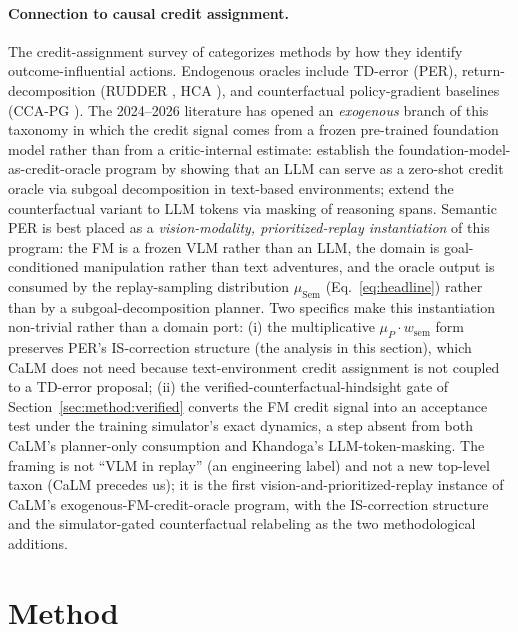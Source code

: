 \documentclass{article}
\begin{document}
\paragraph{Connection to causal credit assignment.}
The credit-assignment survey of \citet{pignatelli2023survey} categorizes methods
by how they identify outcome-influential actions. Endogenous oracles include
TD-error (PER), return-decomposition (RUDDER \citep{arjonamedina2019rudder},
HCA \citep{harutyunyan2019hca}), and counterfactual policy-gradient baselines
(CCA-PG \citep{mesnard2021cca}). The 2024--2026 literature has opened an
\emph{exogenous} branch of this taxonomy in which the credit signal comes
from a frozen pre-trained foundation model rather than from a critic-internal
estimate: \citet{pignatelli2024calm} establish the foundation-model-as-credit-oracle
program by showing that an LLM can serve as a zero-shot credit oracle via
subgoal decomposition in text-based environments; \citet{khandoga2026causalcredit}
extend the counterfactual variant to LLM tokens via masking of reasoning spans.
Semantic PER is best placed as a \emph{vision-modality, prioritized-replay
instantiation} of this program: the FM is a frozen VLM rather than an LLM, the
domain is goal-conditioned manipulation rather than text adventures, and the
oracle output is consumed by the replay-sampling distribution
$\mu_{\text{Sem}}$ (Eq.~\eqref{eq:headline}) rather than by a subgoal-decomposition
planner. Two specifics make this instantiation non-trivial rather than a
domain port: (i) the multiplicative $\mu_P\!\cdot\!w_{\text{sem}}$ form
preserves PER's IS-correction structure (the analysis in this section),
which CaLM does not need because text-environment credit assignment is not
coupled to a TD-error proposal; (ii) the verified-counterfactual-hindsight
gate of Section~\ref{sec:method:verified} converts the FM credit signal into
an acceptance test under the training simulator's exact dynamics, a step
absent from both CaLM's planner-only consumption and Khandoga's
LLM-token-masking. The framing is not ``VLM in replay'' (an
engineering label) and not a new top-level taxon (CaLM precedes us); it is
the first vision-and-prioritized-replay instance of CaLM's
exogenous-FM-credit-oracle program, with the IS-correction structure and the
simulator-gated counterfactual relabeling as the two methodological additions.

\section{Method}
\label{sec:method}
\end{document}
